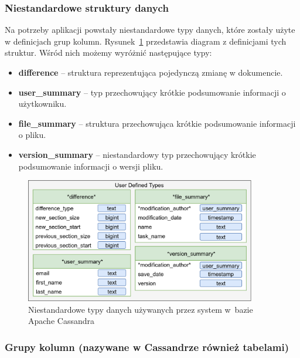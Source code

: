 \subsubsection{Niestandardowe struktury danych} \label{sec:cassadnraUDFs}

Na potrzeby aplikacji powstały niestandardowe typy danych, które zostały użyte w definicjach grup kolumn.
Rysunek~\ref{fig:CassandraUtd} przedstawia diagram z definicjami tych struktur.
Wśród nich możemy wyróżnić następujące typy:
\begin{itemize}
    \item \textbf{difference} -- struktura reprezentująca pojedynczą zmianę w dokumencie.
    \item \textbf{user\_summary} -- typ przechowujący krótkie podsumowanie informacji o użytkowniku.
    \item \textbf{file\_summary} -- struktura przechowująca krótkie podsumowanie informacji o pliku.
    \item \textbf{version\_summary} -- niestandardowy typ przechowujący krótkie podsumowanie informacji o wersji pliku.
\end{itemize}

\begin{figure}[!ht]
\centering
\includegraphics[width=0.9\textwidth]{figures/cassandra_udt.png}
\caption{Niestandardowe typy danych używanych przez system w~bazie Apache Cassandra}
\label{fig:CassandraUtd}
\end{figure}

\subsubsection{Grupy kolumn (nazywane w Cassandrze również tabelami)}

